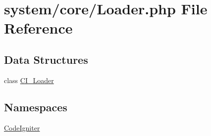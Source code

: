 \hypertarget{_loader_8php}{\section{system/core/\-Loader.php File Reference}
\label{_loader_8php}
}
\subsection*{Data Structures}
\begin{DoxyCompactItemize}
\item 
class \hyperlink{class_c_i___loader}{C\-I\-\_\-\-Loader}
\end{DoxyCompactItemize}
\subsection*{Namespaces}
\begin{DoxyCompactItemize}
\item 
\hyperlink{namespace_code_igniter}{Code\-Igniter}
\end{DoxyCompactItemize}
